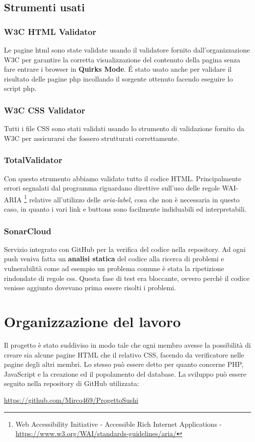 \documentclass{article}
\begin{document}
		\subsection{Strumenti usati}
		
			\subsubsection{W3C HTML Validator}
				Le pagine html sono state validate usando il validatore fornito dall'organizzazione W3C per garantire la corretta visualizzazione del contenuto della pagina senza fare entrare i browser in {\bfseries Quirks Mode}. \'E stato usato anche per validare il risultato delle pagine php incollando il sorgente ottenuto facendo eseguire lo script php.
			
			\subsubsection{W3C CSS Validator}
				Tutti i file CSS sono stati validati usando lo strumento di validazione fornito da W3C per assicurarsi che fossero strutturati correttamente.
			
			\subsubsection{TotalValidator}
			    Con questo strumento abbiamo validato tutto il codice HTML. Principalmente errori segnalati dal programma riguardano direttive sull'uso delle regole WAI-ARIA%
			    \footnote{Web Accessibility Initiative - Accessible Rich Internet Applications -  \url{https://www.w3.org/WAI/standards-guidelines/aria/}}
			    relative all'utilizzo delle \textit{aria-label}, cosa che non è necessaria in questo caso, in quanto i vari link e buttons sono facilmente indiduabili ed interpretabili.
			
			\subsubsection{SonarCloud}
				Servizio integrato con GitHub per la verifica del codice nella repository. Ad ogni push veniva fatta un {\bfseries analisi statica} del codice alla ricerca di problemi e vulnerabilità come ad esempio un problema comune è stata la ripetizione rindondate di regole css. Questa fase di test era bloccante, ovvero perchè il codice venisse aggiunto dovevano prima essere risolti i problemi.
	
	\section{Organizzazione del lavoro}
		Il progetto è stato suddiviso in modo tale che ogni membro avesse la possibilità di creare sia alcune pagine HTML che il relativo CSS, facendo da verificatore nelle pagine degli altri membri.
		Lo stesso può essere detto per quanto concerne PHP, JavaScript e la creazione ed il popolamento del database.
		La sviluppo può essere seguito nella repository di GitHub utilizzata:
		\newline
		\newline
		\centerline{ \url{https://github.com/Mirco469/ProgettoSushi}}
\end{document}
